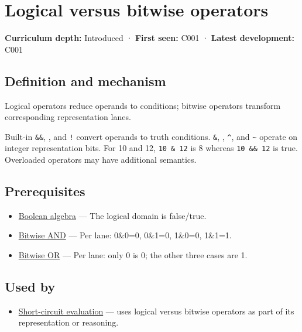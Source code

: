 \hypertarget{appendix-fe6b457d68d8}{}\label{referencestart:appendix-fe6b457d68d8}
\section{Logical versus bitwise operators}\label{appendix-fe6b457d68d8-logical-versus-bitwise-operators}

\textbf{Curriculum depth:} Introduced · \textbf{First seen:} C001 · \textbf{Latest development:} C001

\subsection{Definition and mechanism}\label{appendix-fe6b457d68d8-definition-and-mechanism}

Logical operators reduce operands to conditions; bitwise operators transform corresponding representation lanes.

Built-in \texttt{\&\&}, \texttt{\textbar{}\textbar{}}, and \texttt{!} convert operands to truth conditions. \texttt{\&}, \texttt{\textbar{}}, \texttt{\^{}}, and \texttt{\textasciitilde{}} operate on integer representation bits. For 10 and 12, \texttt{10\ \&\ 12} is 8 whereas \texttt{10\ \&\&\ 12} is true. Overloaded operators may have additional semantics.

\subsection{Prerequisites}\label{appendix-fe6b457d68d8-prerequisites}

\begin{itemize}
\tightlist
\item
  \hyperref[appendix-24475e1596a8]{Boolean algebra} --- The logical domain is false/true.
\item
  \hyperref[appendix-68b52453737c]{Bitwise AND} --- Per lane: 0\&0=0, 0\&1=0, 1\&0=0, 1\&1=1.
\item
  \hyperref[appendix-a427ce8ce8a6]{Bitwise OR} --- Per lane: only 0 is 0; the other three cases are 1.
\end{itemize}

\subsection{Used by}\label{appendix-fe6b457d68d8-used-by}

\begin{itemize}
\tightlist
\item
  \hyperref[appendix-2e245a6fa8d3]{Short-circuit evaluation} --- uses logical versus bitwise operators as part of its representation or reasoning.
\end{itemize}

